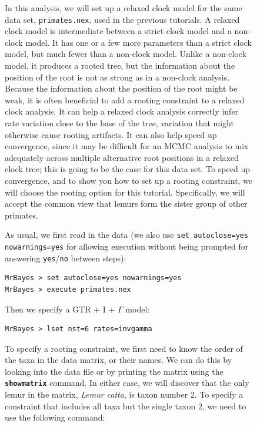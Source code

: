 \documentclass[12pt]{book}
\newcommand{\ttt}[1]{\texttt{#1}}
\newcommand{\tb}[1]{\ttt{\textbf{#1}}}
\begin{document}
\begin{figure}[h]
In this analysis, we will set up a relaxed clock model for the same data set, \ttt{primates.nex},
used in the previous tutorials. A relaxed clock model is intermediate between a strict clock model
and a non-clock model. It has one or a few more parameters than a strict clock model, but much
fewer than a non-clock model. Unlike a non-clock model, it produces a rooted tree, but the
information about the position of the root is not as strong as in a non-clock analysis. Because the
information about the position of the root might be weak, it is often beneficial to add a rooting
constraint to a relaxed clock analysis. It can help a relaxed clock analysis correctly infer rate
variation close to the base of the tree, variation that might otherwise cause rooting artifacts. It
can also help speed up convergence, since it may be difficult for an MCMC analysis to mix
adequately across multiple alternative root positions in a relaxed clock tree; this is going to be
the case for this data set. To speed up convergence, and to show you how to set up a rooting
constraint, we will choose the rooting option for this tutorial. Specifically, we will accept the
common view that lemurs form the sister group of other primates.

As usual, we first read in the data (we also use \ttt{set autoclose=yes nowarnings=yes} for
allowing execution without being prompted for answering \ttt{yes}/\ttt{no} between steps):

\small
\begin{singlespacing}
\begin{verbatim}
MrBayes > set autoclose=yes nowarnings=yes
MrBayes > execute primates.nex
\end{verbatim}
\end{singlespacing}
\normalsize

Then we specify a GTR + I + $\Gamma$ model:

\small
\begin{singlespacing}
\begin{verbatim}
MrBayes > lset nst=6 rates=invgamma
\end{verbatim}
\end{singlespacing}
\normalsize

To specify a rooting constraint, we first need to know the order of the taxa in the data matrix, or
their names. We can do this by looking into the data file or by printing the matrix using the
\tb{showmatrix} command. In either case, we will discover that the only lemur in the matrix,
\textit{Lemur catta}, is taxon number 2. To specify a constraint that includes all taxa but the
single taxon 2, we need to use the following command:


\end{figure}
\end{document}
